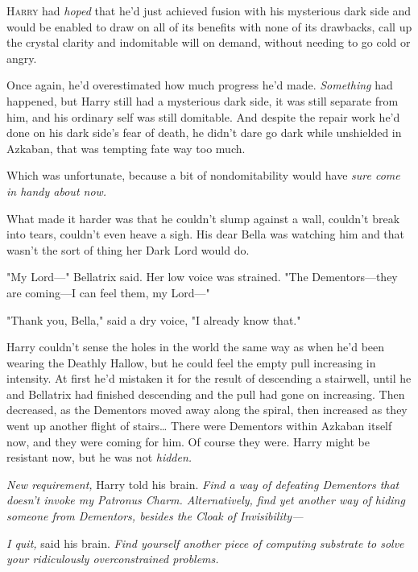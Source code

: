 
\lettrine{H}{arry} had 
\emph{hoped} that he'd just achieved fusion with his mysterious dark side and 
would be enabled to draw on all of its benefits with none of its drawbacks, 
call up the crystal clarity and indomitable will on demand, without needing to 
go cold or angry.

Once again, he'd overestimated how much progress he'd made. \emph{Something} 
had happened, but Harry still had a mysterious dark side, it was still separate 
from him, and his ordinary self was still domitable. And despite the repair 
work he'd done on his dark side's fear of death, he didn't dare go dark while 
unshielded in Azkaban, that was tempting fate way too much.

Which was unfortunate, because a bit of nondomitability would have \emph{sure 
come in handy about now.}

What made it harder was that he couldn't slump against a wall, couldn't break 
into tears, couldn't even heave a sigh. His dear Bella was watching him and 
that wasn't the sort of thing her Dark Lord would do.

"My Lord---" Bellatrix said. Her low voice was strained. "The Dementors---they 
are coming---I can feel them, my Lord---"

"Thank you, Bella," said a dry voice, "I already know that."

Harry couldn't sense the holes in the world the same way as when he'd been 
wearing the Deathly Hallow, but he could feel the empty pull increasing in 
intensity. At first he'd mistaken it for the result of descending a stairwell, 
until he and Bellatrix had finished descending and the pull had gone on 
increasing. Then decreased, as the Dementors moved away along the spiral, then 
increased as they went up another flight of stairs{\ldots} There were Dementors 
within Azkaban itself now, and they were coming for him. Of course they were. 
Harry might be resistant now, but he was not \emph{hidden.}

\emph{New requirement,} Harry told his brain. \emph{Find a way of defeating 
Dementors that doesn't invoke my Patronus Charm. Alternatively, find yet 
another way of hiding someone from Dementors, besides the Cloak of 
Invisibility---}

\emph{I quit,} said his brain. \emph{Find yourself another piece of computing 
substrate to solve your ridiculously overconstrained problems.}


